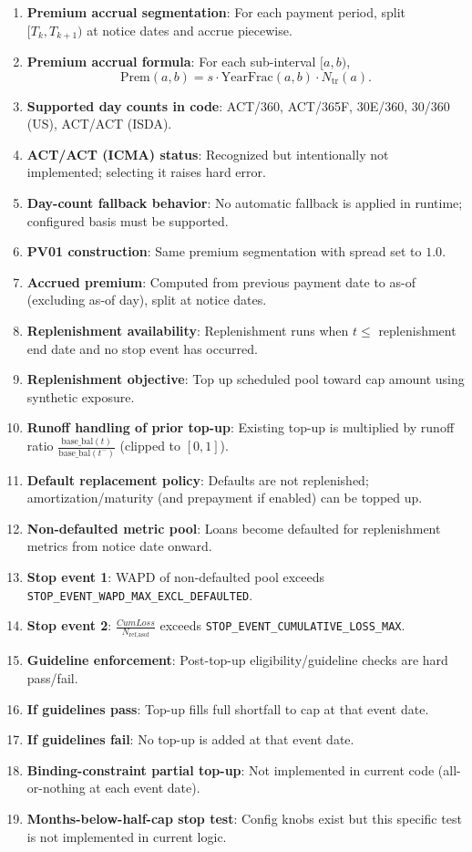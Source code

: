 \documentclass[11pt]{article}
\begin{document}
\begin{enumerate}[label=\arabic*),leftmargin=*,align=left]
\item \textbf{Premium accrual segmentation}: For each payment period, split \([T_k,T_{k+1})\) at notice dates and accrue piecewise.
\item \textbf{Premium accrual formula}: For each sub-interval \([a,b)\),
\[
\text{Prem}(a,b)=s\cdot \text{YearFrac}(a,b)\cdot N_{\text{tr}}(a).
\]
\item \textbf{Supported day counts in code}: ACT/360, ACT/365F, 30E/360, 30/360 (US), ACT/ACT (ISDA).
\item \textbf{ACT/ACT (ICMA) status}: Recognized but intentionally not implemented; selecting it raises hard error.
\item \textbf{Day-count fallback behavior}: No automatic fallback is applied in runtime; configured basis must be supported.
\item \textbf{PV01 construction}: Same premium segmentation with spread set to \(1.0\).
\item \textbf{Accrued premium}: Computed from previous payment date to as-of (excluding as-of day), split at notice dates.

\item \textbf{Replenishment availability}: Replenishment runs when \(t \le\) replenishment end date and no stop event has occurred.
\item \textbf{Replenishment objective}: Top up scheduled pool toward cap amount using synthetic exposure.
\item \textbf{Runoff handling of prior top-up}: Existing top-up is multiplied by runoff ratio \(\frac{\text{base\_bal}(t)}{\text{base\_bal}(t^-)}\) (clipped to \([0,1]\)).
\item \textbf{Default replacement policy}: Defaults are not replenished; amortization/maturity (and prepayment if enabled) can be topped up.
\item \textbf{Non-defaulted metric pool}: Loans become defaulted for replenishment metrics from notice date onward.
\item \textbf{Stop event 1}: WAPD of non-defaulted pool exceeds \texttt{STOP\_EVENT\_WAPD\_MAX\_EXCL\_DEFAULTED}.
\item \textbf{Stop event 2}: \(\frac{CumLoss}{N_{\text{ref,asof}}}\) exceeds \texttt{STOP\_EVENT\_CUMULATIVE\_LOSS\_MAX}.
\item \textbf{Guideline enforcement}: Post-top-up eligibility/guideline checks are hard pass/fail.
\item \textbf{If guidelines pass}: Top-up fills full shortfall to cap at that event date.
\item \textbf{If guidelines fail}: No top-up is added at that event date.
\item \textbf{Binding-constraint partial top-up}: Not implemented in current code (all-or-nothing at each event date).
\item \textbf{Months-below-half-cap stop test}: Config knobs exist but this specific test is not implemented in current logic.


\end{enumerate}
\end{document}
